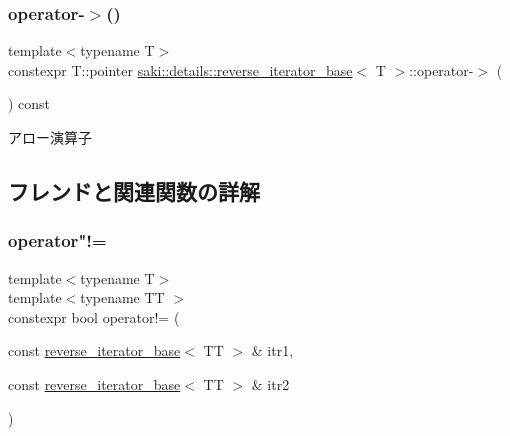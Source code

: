 \subsubsection{\texorpdfstring{operator-\/$>$()}{operator->()}}
{\footnotesize\ttfamily template$<$typename T$>$ \\
constexpr T\+::pointer \mbox{\hyperlink{classsaki_1_1details_1_1reverse__iterator__base}{saki\+::details\+::reverse\+\_\+iterator\+\_\+base}}$<$ T $>$\+::operator-\/$>$ (\begin{DoxyParamCaption}{ }\end{DoxyParamCaption}) const\hspace{0.3cm}{\ttfamily [inline]}}



アロー演算子 



\subsection{フレンドと関連関数の詳解}
\mbox{\label{classsaki_1_1details_1_1reverse__iterator__base_a4f19034a62d0d61440f64e39642e2cc6}} 
\subsubsection{\texorpdfstring{operator"!=}{operator!=}}
{\footnotesize\ttfamily template$<$typename T$>$ \\
template$<$typename TT $>$ \\
constexpr bool operator!= (\begin{DoxyParamCaption}\item[{const \mbox{\hyperlink{classsaki_1_1details_1_1reverse__iterator__base}{reverse\+\_\+iterator\+\_\+base}}$<$ TT $>$ \&}]{itr1,  }\item[{const \mbox{\hyperlink{classsaki_1_1details_1_1reverse__iterator__base}{reverse\+\_\+iterator\+\_\+base}}$<$ TT $>$ \&}]{itr2 }\end{DoxyParamCaption})\hspace{0.3cm}{\ttfamily [friend]}}

\mbox{\label{classsaki_1_1details_1_1reverse__iterator__base_ad8dd5df90aef93e3b60ea87f584a6acf}} 
